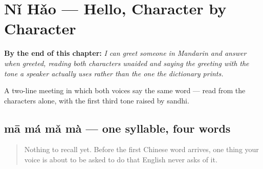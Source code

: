 
\chapter{Nǐ Hǎo — Hello, Character by Character}
\label{ch:zh-nihao}

\begin{chapteropening}
\textbf{By the end of this chapter:} \emph{I can greet someone in Mandarin and answer when greeted, reading both characters unaided and saying the greeting with the tone a speaker actually uses rather than the one the dictionary prints.}

A two-line meeting in which both voices say the same word — read from the characters alone, with the first third tone raised by sandhi.
\end{chapteropening}

\section[mā má mǎ mà]{mā má mǎ mà — one syllable, four words}

\label{lesson:ZH-C01-tones}



\begin{quote}
Nothing to recall yet. Before the first Chinese word arrives, one thing your voice is about to be asked to do that English never asks of it.
\end{quote}


